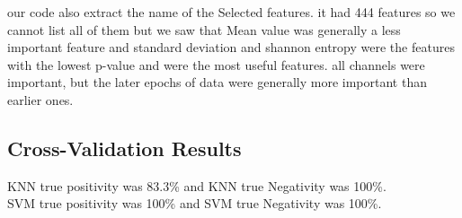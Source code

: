 \documentclass[11pt]{article}
\begin{document}
our code also extract the name of the Selected features. it had 444 features so we cannot list all of them
but we saw that Mean value was generally a less important feature and standard deviation and shannon entropy were
the features with the lowest p-value and were the most useful features. all channels were important, but the later epochs of data were generally more important than
earlier ones. \\


\subsection{Cross-Validation Results}
KNN true positivity was 83.3\% and KNN true Negativity was 100\%. \\
SVM true positivity was 100\% and SVM true Negativity was 100\%. \\
\end{document}
